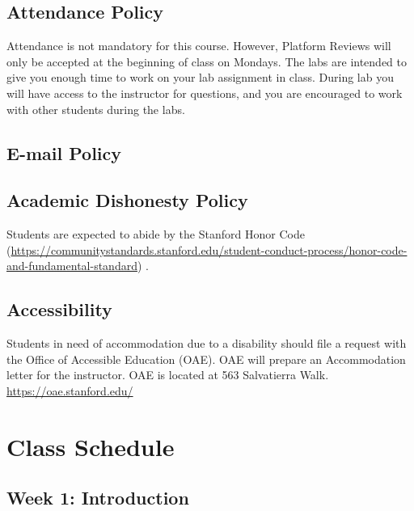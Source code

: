 \documentclass[11pt,]{article}
\begin{document}
\hypertarget{attendance-policy}{%
\subsection{Attendance Policy}\label{attendance-policy}}

Attendance is not mandatory for this course. However, Platform Reviews
will only be accepted at the beginning of class on Mondays. The labs are
intended to give you enough time to work on your lab assignment in
class. During lab you will have access to the instructor for questions,
and you are encouraged to work with other students during the labs.

\hypertarget{e-mail-policy}{%
\subsection{E-mail Policy}\label{e-mail-policy}}

\hypertarget{academic-dishonesty-policy}{%
\subsection{Academic Dishonesty
Policy}\label{academic-dishonesty-policy}}

Students are expected to abide by the Stanford Honor Code
(\url{https://communitystandards.stanford.edu/student-conduct-process/honor-code-and-fundamental-standard})
.

\hypertarget{accessibility}{%
\subsection{Accessibility}\label{accessibility}}

Students in need of accommodation due to a disability should file a
request with the Office of Accessible Education (OAE). OAE will prepare
an Accommodation letter for the instructor. OAE is located at 563
Salvatierra Walk. \url{https://oae.stanford.edu/}

\newpage

\hypertarget{class-schedule}{%
\section{Class Schedule}\label{class-schedule}}

\hypertarget{week-1-introduction}{%
\subsection{Week 1: Introduction}\label{week-1-introduction}}
\end{document}
